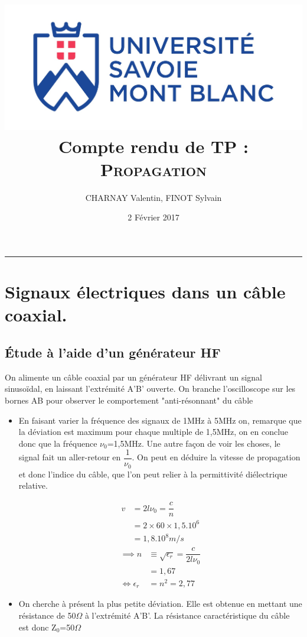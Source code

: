 \documentclass[12pt,a4paper]{article}
\author{CHARNAY Valentin, FINOT Sylvain}
\title{
	\includegraphics[scale=0.3]{logousmb}\\
	Compte rendu de TP :\\ 
	\scshape Propagation}
\date{2 Février 2017}
\begin{document}
	\maketitle
	\rule{\linewidth}{0.4pt}
	\section{Signaux électriques  dans  un  câble  coaxial.}
	\subsection{Étude à l'aide d'un générateur HF}
	On alimente un câble coaxial par un générateur HF délivrant un signal sinusoïdal, en laissant l'extrémité A'B' ouverte. On branche l'oscilloscope sur les bornes AB pour observer le comportement "anti-résonnant" du câble
	\begin{itemize}[label=$\circ$]
		\item En faisant varier la fréquence des signaux de 1MHz à 5MHz on, remarque que la déviation est maximum pour chaque multiple de 1,5MHz, on en conclue donc que la fréquence $\nu_0$=1,5MHz. Une autre façon de voir les choses, le signal fait un aller-retour en $\dfrac{1}{\nu_0}$. On peut en déduire la vitesse de propagation et donc l'indice du câble, que l'on peut relier à la permittivité diélectrique relative.
		\begin{multicols}{2}
			\begin{align*}
			v&=2l\nu_0=\dfrac{c}{n}\\
			&=2\times60\times1,5.10^6\\
			&=1,8.10^8 m/s
			\end{align*}
			\vfill
			\setlength\columnseprule{0.5pt}
			\columnbreak
			\begin{align*}
			\implies n&\equiv\sqrt{\epsilon_r}=\dfrac{c}{2l\nu_0}\\
			&=1,67\\
			\iff \epsilon_r&=n^2=2,77
			\end{align*}
		\end{multicols}
		\item On cherche à présent la plus petite déviation. Elle est obtenue en mettant une résistance de 50$\Omega$ à l'extrémité A'B'. La résistance caractéristique du câble est donc Z$_0$=50$\Omega$ 
	\end{itemize}
\end{document}
